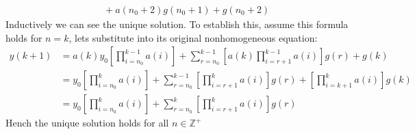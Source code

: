 \begin{itemize}
\begin{explanation}
\begin{align*}
                         & \quad +a(n_0+2)g(n_0+1)+g(n_0+2)
            \end{align*}
            Inductively we can see the unique solution. To establish this, assume this formula holds for $n=k$, lets substitute into its original nonhomogeneous equation:
                \begin{align*}
                    y(k+1) & =a(k)y_0\left[\prod_{i=n_0}^{k-1} a(i)\right]+\sum_{r=n_0}^{k-1}\left[a(k)\prod_{i=r+1}^{k-1} a(i)\right]g(r)+g(k) \\
                           & =y_0\left[\prod_{i=n_0}^k a(i)\right]+\sum_{r=n_0}^{k-1}\left[\prod_{i=r+1}^k a(i)\right]g(r)+\left[\prod_{i=k+1}^k a(i)\right]g(k) \\
                           & =y_0\left[\prod_{i=n_0}^k a(i)\right]+\sum_{r=n_0}^k\left[\prod_{i=r+1}^k a(i)\right]g(r)
                \end{align*}
            Hench the unique solution holds for all $n\in\mathbb{Z}^+$
        \end{explanation}
\end{itemize}

